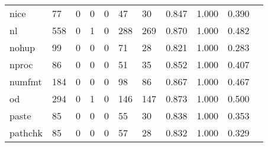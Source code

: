 \begin{longtable}{lp{1.10cm}p{1.10cm}p{1.10cm}p{1.10cm}p{1.10cm}p{1.10cm}p{1.10cm}p{1.10cm}p{1.10cm}p{1.10cm}}
nice      &                     77 &                                  0 &                                 0 &                                0 &                                47 &                              30 &                          0.847 &                                 1.000 &                               0.390 \\
nl        &                    558 &                                  0 &                                 1 &                                0 &                               288 &                             269 &                          0.870 &                                 1.000 &                               0.482 \\
nohup     &                     99 &                                  0 &                                 0 &                                0 &                                71 &                              28 &                          0.821 &                                 1.000 &                               0.283 \\
nproc     &                     86 &                                  0 &                                 0 &                                0 &                                51 &                              35 &                          0.852 &                                 1.000 &                               0.407 \\
numfmt    &                    184 &                                  0 &                                 0 &                                0 &                                98 &                              86 &                          0.867 &                                 1.000 &                               0.467 \\
od        &                    294 &                                  0 &                                 1 &                                0 &                               146 &                             147 &                          0.873 &                                 1.000 &                               0.500 \\
paste     &                     85 &                                  0 &                                 0 &                                0 &                                55 &                              30 &                          0.838 &                                 1.000 &                               0.353 \\
pathchk   &                     85 &                                  0 &                                 0 &                                0 &                                57 &                              28 &                          0.832 &                                 1.000 &                               0.329 \\

\end{longtable}
